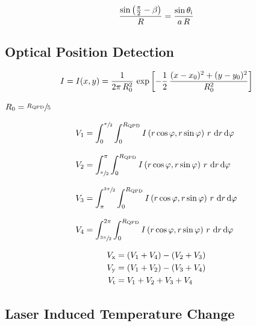 \begin{equation}
  \frac{\sin\left( \frac{\pi}{2}-\beta \right)}{R} = 
  \frac{\sin\theta_{\mathrm{i}}}{a\,R}
  \label{eq:Th-sine-law}
\end{equation}


\subsection{Optical Position Detection\label{sec:Th-QPD}}

\begin{equation}
  I = I(x, y) = \frac{1}{2\pi\,R_{0}^{2}}\,\exp\left[ 
  -\frac{1}{2}\,\frac{(x-x_{0})^{2} + (y - y_{0})^{2}}{R_{0}^{2}} \right]
    \label{eq:Th-intensity}
\end{equation}

$R_{0}=\sfrac{R_{\mathrm{QPD}}}{5}$


\begin{subequations}
\begin{align}
  V_{\mathrm{1}} & = \int_{0}^{\sfrac{\pi}{2}}\int_{0}^{R_{\mathrm{QPD}}}
  I\left( r\cos\varphi, r\sin\varphi \right)\,r\,\dd{r}\dd{\varphi} 
  \\[3mm]
  V_{\mathrm{2}} & = \int_{\sfrac{\pi}{2}}^{\pi}\int_{0}^{R_{\mathrm{QPD}}}
  I\left(r\cos\varphi, r\sin\varphi\right)\,r\,\dd{r}\dd{\varphi} 
  \\[3mm]
  V_{\mathrm{3}} & = \int_{\pi}^{\sfrac{3\pi}{2}}\int_{0}^{R_{\mathrm{QPD}}}
  I\left(r\cos\varphi, r\sin\varphi\right)\,r\,\dd{r}\dd{\varphi} 
  \\[3mm]
  V_{\mathrm{4}} & = \int_{\sfrac{3\pi}{2}}^{2\pi}\int_{0}^{R_{\mathrm{QPD}}}
  I\left(r\cos\varphi, r\sin\varphi\right)\,r\,\dd{r}\dd{\varphi}
\end{align}
\end{subequations}


\begin{subequations}
\begin{align}
  V_{\mathrm{x}} & = \left( V_{\mathrm{1}}+V_{\mathrm{4}} \right) - \left( V_{\mathrm{2}} + 
  V_{\mathrm{3}}  \right) \\
  V_{\mathrm{y}} & = \left( V_{\mathrm{1}}+V_{\mathrm{2}} \right) - \left( V_{\mathrm{3}} + 
  V_{\mathrm{4}}  \right) \\
  V_{\mathrm{t}} & = V_{\mathrm{1}}+V_{\mathrm{2}} + V_{\mathrm{3}} + V_{\mathrm{4}}
\end{align}
\end{subequations}


\subsection{Laser Induced Temperature Change\label{sec:Th-temperature}}

